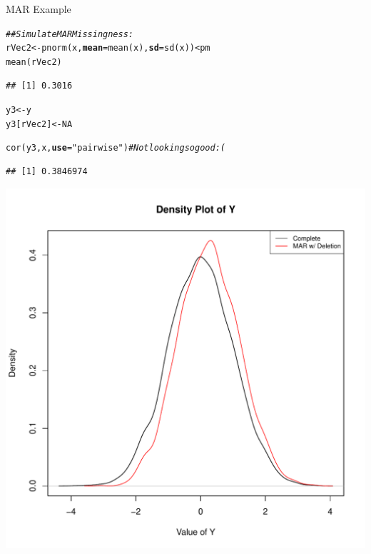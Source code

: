 \documentclass{beamer}\usepackage[]{graphicx}\usepackage[]{color}
\makeatletter
\newcommand{\hlnum}[1]{\textcolor[rgb]{0.69,0.494,0}{#1}}%
\newcommand{\hlstr}[1]{\textcolor[rgb]{0.749,0.012,0.012}{#1}}%
\newcommand{\hlcom}[1]{\textcolor[rgb]{0.514,0.506,0.514}{\textit{#1}}}%
\newcommand{\hlopt}[1]{\textcolor[rgb]{0,0,0}{#1}}%
\newcommand{\hlstd}[1]{\textcolor[rgb]{0,0,0}{#1}}%
\newcommand{\hlkwb}[1]{\textcolor[rgb]{0,0.341,0.682}{#1}}%
\newcommand{\hlkwc}[1]{\textcolor[rgb]{0,0,0}{\textbf{#1}}}%
\newcommand{\hlkwd}[1]{\textcolor[rgb]{0.004,0.004,0.506}{#1}}%
\newenvironment{kframe}{%
 \def\at@end@of@kframe{}%
 \ifinner\ifhmode%
  \def\at@end@of@kframe{\end{minipage}}%
  \begin{minipage}{\columnwidth}%
 \fi\fi%
 \def\FrameCommand##1{\hskip\@totalleftmargin \hskip-\fboxsep
 \colorbox{shadecolor}{##1}\hskip-\fboxsep
     \hskip-\linewidth \hskip-\@totalleftmargin \hskip\columnwidth}%
 \MakeFramed {\advance\hsize-\width
   \@totalleftmargin\z@ \linewidth\hsize
   \@setminipage}}%
 {\par\unskip\endMakeFramed%
 \at@end@of@kframe}
\newenvironment{knitrout}{}{} %
\makeatother
\begin{document}

\begin{frame}{MAR Example}
  
\begin{knitrout}\footnotesize
{}\color{fgcolor}\begin{kframe}
\begin{alltt}
\hlcom{## Simulate MAR Missingness:}
\hlstd{rVec2} \hlkwb{<-} \hlkwd{pnorm}\hlstd{(x,} \hlkwc{mean} \hlstd{=} \hlkwd{mean}\hlstd{(x),} \hlkwc{sd} \hlstd{=} \hlkwd{sd}\hlstd{(x))} \hlopt{<} \hlstd{pm}
\hlkwd{mean}\hlstd{(rVec2)}
\end{alltt}
\begin{verbatim}
## [1] 0.3016
\end{verbatim}
\begin{alltt}
\hlstd{y3} \hlkwb{<-} \hlstd{y}
\hlstd{y3[rVec2]} \hlkwb{<-} \hlnum{NA}

\hlkwd{cor}\hlstd{(y3, x,} \hlkwc{use} \hlstd{=} \hlstr{"pairwise"}\hlstd{)} \hlcom{# Not looking so good :(}
\end{alltt}
\begin{verbatim}
## [1] 0.3846974
\end{verbatim}
\end{kframe}
\end{knitrout}

\pagebreak

\begin{knitrout}\footnotesize
{}\color{fgcolor}

{\centering \includegraphics[width=0.65\linewidth]{figure/unnamed-chunk-11-1} 

}



\end{knitrout}

\end{frame}
\end{document}
